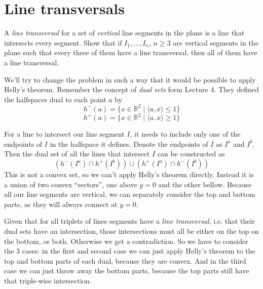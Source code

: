 \documentclass{article}
\newcommand{\R}{\mathbb{R}}
\begin{document}
  \section{Line transversals}
  \begin{centerframebox}
    A \textit{line transversal} for a set of \textit{vertical} line segments in the plane is a line that intersects every
    segment. Show that if $I_1, \dots , I_n$, $n \geq 3$ are vertical segments in the plane such that every
    three of them have a line transversal, then all of them have a line transversal.
  \end{centerframebox}
  We'll try to change the problem in such a way that it would be possible to apply Helly's theorem.
  Remember the concept of \textit{dual sets} form Lecture 4.
  They defined the halfspaces dual to each point $a$ by
  \[h^-(a) = \{x \in \R^2 \mid \langle a,x\rangle \leq 1\}\]
  \[h^+(a) = \{x \in \R^2 \mid \langle a,x\rangle \geq 1\}\]

  For a line to intersect our line segment $I$, it needs to include only one of the endpoints of $I$ in the halfspace it defines.
  Denote the endpoints of $I$ as $I^a$ and $I^b$.
  Then the dual set of all the lines that intersect $I$ can be constructed as
  \[ \left(h^-(I^a) \cap h^+(I^b)\right) \cup \left(h^+(I^a) \cap h^-(I^b)\right) \]
  This is not a convex set, so we can't apply Helly's theorem directly.
  Instead it is a union of two convex ``sectors'', one above $y=0$ and the other bellow.
  Because all our line segments are vertical, we can separately consider the top and bottom parts, as they will always connect at $y=0$.

  Given that for all triplets of lines segments have a \textit{line transversal}, i.e. that their dual sets have an intersection,
  those intersections must all be either on the top on the bottom, or both. Otherwise we get a contradiction.
  So we have to consider the 3 cases:
  in the first and second case we can just apply Helly's theorem to the top and bottom parts of each dual, because they are convex.
  And in the third case we can just throw away the bottom parts, because the top parts still have that triple-wise intersection.
\end{document}
